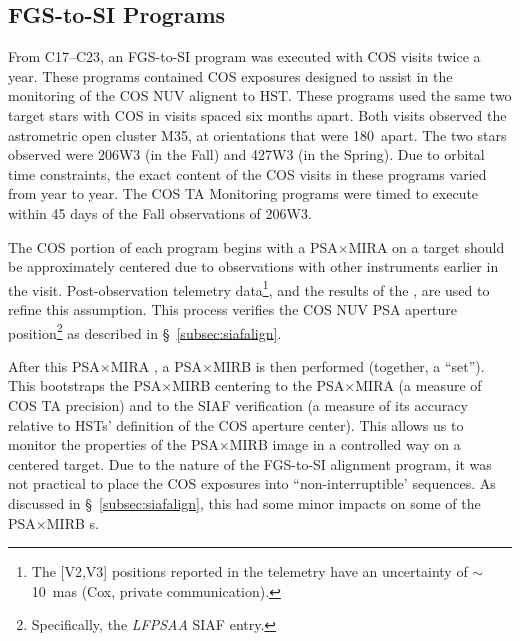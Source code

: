 \subsection{FGS-to-SI Programs}\label{subsec:fgs2si}
From C17--C23, an FGS-to-SI program was executed with COS visits twice a year. These programs contained COS exposures designed to assist in the monitoring of the COS NUV alignent to HST.
These programs used the same two target stars with COS in visits spaced six months apart. Both visits observed the astrometric open cluster M35, at orientations that were 180\degree~apart.
The two stars observed were 206W3 (in the Fall) and 427W3 (in the Spring). Due to orbital time constraints, the exact content of the COS visits in these programs varied from year to year.
The COS TA Monitoring programs were timed to execute within 45 days of the Fall observations of 206W3.

The COS portion of each program begins with a PSA$\times$MIRA  on a target should be approximately centered due to observations with other instruments earlier in the visit.
Post-observation telemetry data\footnote{The [V2,V3] positions reported in the telemetry have an uncertainty of $\sim$ 10~mas (Cox, private communication).}, and the results of the , are used to refine this assumption.
This process verifies the COS NUV PSA aperture position\footnote{Specifically, the \textit{LFPSAA} SIAF entry.} as described in \S~\ref{subsec:siafalign}.

After this PSA$\times$MIRA , a PSA$\times$MIRB  is then performed (together, a ``set'').
This bootstraps the PSA$\times$MIRB centering to the PSA$\times$MIRA (a measure of COS TA precision) and to the SIAF verification (a measure of its accuracy relative to HSTs' definition of the COS aperture center).
This allows us to monitor the properties of the PSA$\times$MIRB image in a controlled way on a centered target.
Due to the nature of the FGS-to-SI alignment program, it was not practical to place the COS exposures into ``non-interruptible' sequences.
As discussed in \S~\ref{subsec:siafalign}, this had some minor impacts on some of the PSA$\times$MIRB s.

